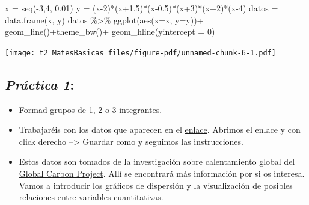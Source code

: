 \documentclass[
  letterpaper,
  DIV=11,
  numbers=noendperiod]{scrreprt}
\newenvironment{Shaded}{\begin{snugshade}}{\end{snugshade}}
\newcommand{\AttributeTok}[1]{\textcolor[rgb]{0.40,0.45,0.13}{#1}}
\newcommand{\DecValTok}[1]{\textcolor[rgb]{0.68,0.00,0.00}{#1}}
\newcommand{\FloatTok}[1]{\textcolor[rgb]{0.68,0.00,0.00}{#1}}
\newcommand{\FunctionTok}[1]{\textcolor[rgb]{0.28,0.35,0.67}{#1}}
\newcommand{\NormalTok}[1]{\textcolor[rgb]{0.00,0.23,0.31}{#1}}
\newcommand{\OtherTok}[1]{\textcolor[rgb]{0.00,0.23,0.31}{#1}}
\newcommand{\SpecialCharTok}[1]{\textcolor[rgb]{0.37,0.37,0.37}{#1}}
\begin{document}
\begin{Shaded}
\begin{Highlighting}[]
\NormalTok{x }\OtherTok{=} \FunctionTok{seq}\NormalTok{(}\SpecialCharTok{{-}}\DecValTok{3}\NormalTok{,}\DecValTok{4}\NormalTok{, }\FloatTok{0.01}\NormalTok{)}
\NormalTok{y }\OtherTok{=}\NormalTok{ (x}\DecValTok{{-}2}\NormalTok{)}\SpecialCharTok{*}\NormalTok{(x}\FloatTok{+1.5}\NormalTok{)}\SpecialCharTok{*}\NormalTok{(x}\FloatTok{{-}0.5}\NormalTok{)}\SpecialCharTok{*}\NormalTok{(x}\SpecialCharTok{+}\DecValTok{3}\NormalTok{)}\SpecialCharTok{*}\NormalTok{(x}\SpecialCharTok{+}\DecValTok{2}\NormalTok{)}\SpecialCharTok{*}\NormalTok{(x}\DecValTok{{-}4}\NormalTok{)}
\NormalTok{datos }\OtherTok{=} \FunctionTok{data.frame}\NormalTok{(x, y)}
\NormalTok{datos }\SpecialCharTok{\%\textgreater{}\%} \FunctionTok{ggplot}\NormalTok{(}\FunctionTok{aes}\NormalTok{(}\AttributeTok{x=}\NormalTok{x, }\AttributeTok{y=}\NormalTok{y))}\SpecialCharTok{+}
  \FunctionTok{geom\_line}\NormalTok{()}\SpecialCharTok{+}\FunctionTok{theme\_bw}\NormalTok{()}\SpecialCharTok{+}
  \FunctionTok{geom\_hline}\NormalTok{(}\AttributeTok{yintercept =} \DecValTok{0}\NormalTok{)}
\end{Highlighting}
\end{Shaded}

\texttt{[image: t2\_MatesBasicas\_files/figure-pdf/unnamed-chunk-6-1.pdf]}

\subsection{\texorpdfstring{{\emph{Práctica
1}}:}{Práctica 1:}}\label{pruxe1ctica-1}

\begin{itemize}
\item
  Formad grupos de 1, 2 o 3 integrantes.
\item
  Trabajaréis con los datos que aparecen en el
  \href{https://raw.githubusercontent.com/Cruzalirio/Ucentral/master/Bases/Global_Carbon_Budget_2018.csv}{enlace}.
  Abrimos el enlace y con click derecho --\textgreater{} Guardar como y
  seguimos las instrucciones.
\item
  Estos datos son tomados de la investigación sobre calentamiento global
  del \href{https://globalcarbonbudgetdata.org/latest-data.html}{Global
  Carbon Project}. Allí se encontrará más información por si os
  interesa. Vamos a introducir los gráficos de dispersión y la
  visualización de posibles relaciones entre variables cuantitativas.
\end{itemize}
\end{document}
